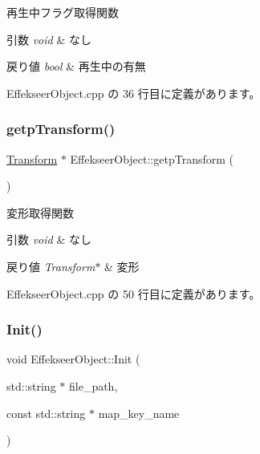 再生中フラグ取得関数 


\begin{DoxyParams}{引数}
{\em void} & なし \\
\hline
\end{DoxyParams}

\begin{DoxyRetVals}{戻り値}
{\em bool} & 再生中の有無 \\
\hline
\end{DoxyRetVals}


 Effekseer\+Object.\+cpp の 36 行目に定義があります。

\mbox{\label{class_effekseer_object_adb8963108c1ddd2ce6926f974b5f0acc}} 
\subsubsection{\texorpdfstring{getp\+Transform()}{getpTransform()}}
{\footnotesize\ttfamily \mbox{\hyperlink{class_transform}{Transform}} $\ast$ Effekseer\+Object\+::getp\+Transform (\begin{DoxyParamCaption}{ }\end{DoxyParamCaption})}



変形取得関数 


\begin{DoxyParams}{引数}
{\em void} & なし \\
\hline
\end{DoxyParams}

\begin{DoxyRetVals}{戻り値}
{\em Transform$\ast$} & 変形 \\
\hline
\end{DoxyRetVals}


 Effekseer\+Object.\+cpp の 50 行目に定義があります。

\mbox{\label{class_effekseer_object_a1a868153244f3b30ed4ab63e3b9cee91}} 
\subsubsection{\texorpdfstring{Init()}{Init()}}
{\footnotesize\ttfamily void Effekseer\+Object\+::\+Init (\begin{DoxyParamCaption}\item[{std\+::string $\ast$}]{file\+\_\+path,  }\item[{const std\+::string $\ast$}]{map\+\_\+key\+\_\+name }\end{DoxyParamCaption})}



